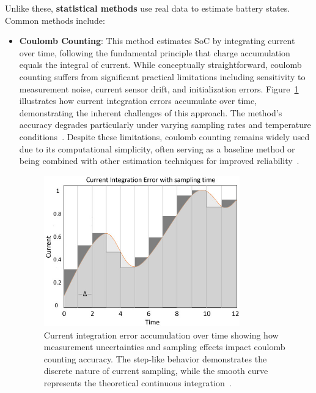 Unlike these, \textbf{ statistical methods} use real data to estimate battery states. Common methods include:
\begin{itemize}
    \item \textbf{Coulomb Counting}: This method estimates SoC by integrating current over time, following the fundamental principle that charge accumulation equals the integral of current. While conceptually straightforward, coulomb counting suffers from significant practical limitations including sensitivity to measurement noise, current sensor drift, and initialization errors. Figure~\ref{fig:current_integration_error} illustrates how current integration errors accumulate over time, demonstrating the inherent challenges of this approach. The method's accuracy degrades particularly under varying sampling rates and temperature conditions~\cite{noauthor_implementation_nodate}. Despite these limitations, coulomb counting remains widely used due to its computational simplicity, often serving as a baseline method or being combined with other estimation techniques for improved reliability~\cite{movassagh_critical_2021}.

\begin{figure}[htbp]
\centering
\includegraphics[width=0.8\textwidth]{imgs/coulomb.jpg}
\caption{Current integration error accumulation over time showing how measurement uncertainties and sampling effects impact coulomb counting accuracy. The step-like behavior demonstrates the discrete nature of current sampling, while the smooth curve represents the theoretical continuous integration~\cite{movassagh_critical_2021}.}
\label{fig:current_integration_error}
\end{figure}


\end{itemize}
